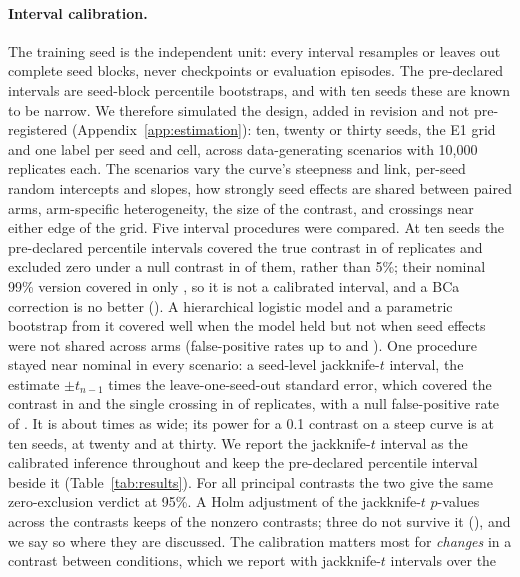 \paragraph{Interval calibration.}
\label{sec:stats}
The training seed is the independent unit: every interval resamples or leaves out complete seed blocks, never
checkpoints or evaluation episodes. The pre-declared intervals are seed-block percentile bootstraps, and with ten
seeds these are known to be narrow. We therefore simulated the design, added in revision and not pre-registered
(Appendix~\ref{app:estimation}): ten, twenty or thirty seeds, the E1 grid and one label per seed and cell, across
\VcalScen{} data-generating scenarios with 10,000 replicates each. The scenarios vary the curve's steepness and link,
per-seed random intercepts and slopes, how strongly seed effects are shared between paired arms, arm-specific
heterogeneity, the size of the contrast, and crossings near either edge of the grid. Five interval procedures were
compared. At ten seeds the pre-declared percentile intervals covered the true contrast in \VcalPctCov{} of
replicates and excluded zero under a null contrast in \VcalPctFP{} of them, rather than 5\%; their nominal 99\%
version covered in only \VcalPctCovNine{}, so it is not a calibrated interval, and a BCa correction is no better
(\VcalBcaCov{}). A hierarchical logistic model and a parametric bootstrap from it covered well when the model held but
not when seed effects were not shared across arms (false-positive rates up to \VcalGlmmFPMax{} and \VcalPbootFPMax{}).
One procedure stayed near nominal in every scenario: a seed-level jackknife-$t$ interval, the estimate $\pm
t_{n-1}$ times the leave-one-seed-out standard error, which covered the contrast in \VcalJtCov{} and the single
crossing in \VcalJtCovW{} of replicates, with a null false-positive rate of \VcalJtFP{}. It is about
\VcalWidthRatio{} times as wide; its power for a 0.1 contrast on a steep curve is \VcalPowTen{} at ten seeds,
\VcalPowTwenty{} at twenty and \VcalPowThirty{} at thirty. We report the jackknife-$t$ interval as the calibrated
inference throughout and keep the pre-declared percentile interval beside it (Table~\ref{tab:results}). For all
\VrvNContrasts{} principal contrasts the two give the same zero-exclusion verdict at 95\%. A Holm adjustment of the
jackknife-$t$ $p$-values across the \VrvNContrasts{} contrasts keeps \VjtHolmKept{} of the \VjtNExcl{} nonzero
contrasts; three do not survive it (\VjtHolmLost{}), and we say so where they are discussed. The calibration matters
most for \emph{changes} in a contrast between conditions, which we report with jackknife-$t$ intervals over the
